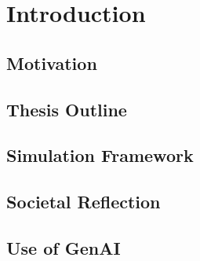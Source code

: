 \chapter{Introduction}
\label{chapter:introduction}

\section{Motivation}

\section{Thesis Outline}

\section{Simulation Framework}

\section{Societal Reflection}

\section{Use of GenAI}

